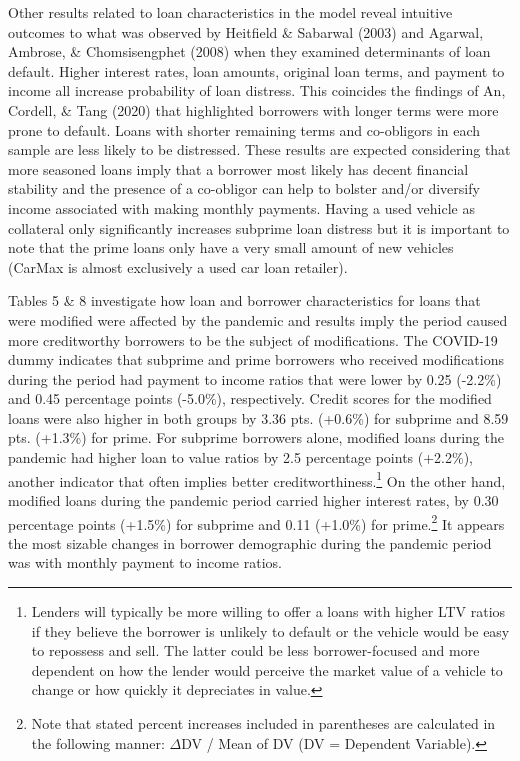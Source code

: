 \documentclass[10.5pt]{article}
\begin{document}
Other results related to loan characteristics in the model reveal intuitive outcomes to what was observed by Heitfield \& Sabarwal (2003) and Agarwal, Ambrose, \& Chomsisengphet (2008) when they examined determinants of loan default. Higher interest rates, loan amounts, original loan terms, and payment to income all increase probability of loan distress. This coincides the findings of An, Cordell, \& Tang (2020) that highlighted borrowers with longer terms were more prone to default. Loans with shorter remaining terms and co-obligors in each sample are less likely to be distressed. These results are expected considering that more seasoned loans imply that a borrower most likely has decent financial stability and the presence of a co-obligor can help to bolster and/or diversify income associated with making monthly payments. Having a used vehicle as collateral only significantly increases subprime loan distress but it is important to note that the prime loans only have a very small amount of new vehicles (CarMax is almost exclusively a used car loan retailer).

Tables 5 \& 8 investigate how loan and borrower characteristics for loans that were modified were affected by the pandemic and results imply the period caused more creditworthy borrowers to be the subject of modifications. The COVID-19 dummy indicates that subprime and prime borrowers who received modifications during the period had payment to income ratios that were lower by 0.25 (-2.2\%) and 0.45 percentage points (-5.0\%), respectively. Credit scores for the modified loans were also higher in both groups by 3.36 pts. (+0.6\%) for subprime and 8.59 pts. (+1.3\%) for prime. For subprime borrowers alone, modified loans during the pandemic had higher loan to value ratios by 2.5 percentage points (+2.2\%), another indicator that often implies better creditworthiness.\footnote{Lenders will typically be more willing to offer a loans with higher LTV ratios if they believe the borrower is unlikely to default or the vehicle would be easy to repossess and sell. The latter could be less borrower-focused and more dependent on how the lender would perceive the market value of a vehicle to change or how quickly it depreciates in value.} On the other hand, modified loans during the pandemic period carried higher interest rates, by 0.30 percentage points (+1.5\%) for subprime and 0.11 (+1.0\%) for prime.\footnote{Note that stated percent increases included in parentheses are calculated in the following manner: $\Delta$DV / Mean of DV (DV = Dependent Variable).} It appears the most sizable changes in borrower demographic during the pandemic period was with monthly payment to income ratios.
\end{document}
